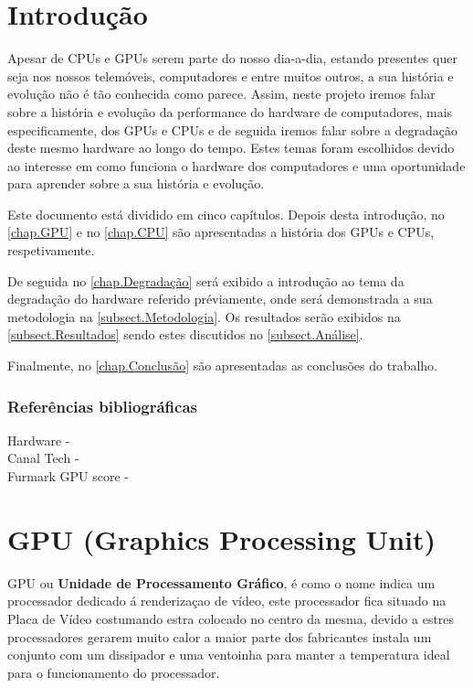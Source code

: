 \documentclass{report}
\begin{document}
\clearpage
{}

\chapter{Introdução}
\label{chap.introducao}
\begin{large}
	Apesar de \ac{CPU}s e \ac{GPU}s serem parte do nosso dia-a-dia, estando presentes quer seja nos nossos telemóveis, computadores e entre muitos outros, a sua história e evolução não é tão conhecida como parece. Assim, neste projeto iremos falar sobre a história e evolução da performance do hardware de computadores, mais especificamente, dos \ac{GPU}s e \ac{CPU}s e de seguida iremos falar sobre a degradação deste mesmo hardware ao longo do tempo. Estes temas foram escolhidos devido ao interesse em como funciona o hardware dos computadores e uma oportunidade para aprender sobre a sua história e evolução.

Este documento está dividido em cinco capítulos.
Depois desta introdução,
no \autoref{chap.GPU} e no \autoref{chap.CPU} são apresentadas a história dos \ac{GPU}s e \ac{CPU}s, respetivamente.

De seguida no \autoref{chap.Degradação} será exibido a introdução ao tema da degradação do hardware referido préviamente, onde será demonstrada a sua metodologia na \autoref{subsect.Metodologia}. Os resultados serão exibidos na \autoref{subsect.Resultados} sendo estes discutidos no \autoref{subsect.Análise}.

Finalmente, no \autoref{chap.Conclusão} são apresentadas
as conclusões do trabalho.
\end{large}


\subsection{Referências bibliográficas}
Hardware - \cite{hardware}\\
Canal Tech - \cite{canaltech}\\
Furmark \ac{GPU} score - \cite{furmark}\\

\chapter{GPU (Graphics Processing Unit)}
\label{chap.GPU}

\ac{GPU} ou \textbf{Unidade de Processamento Gráfico}, é como o nome indica um processador dedicado á renderizaçao de vídeo, este processador fica situado na Placa de Vídeo costumando estra colocado no centro da mesma, devido a estres processadores gerarem muito calor a maior parte dos fabricantes instala um conjunto com um dissipador e uma ventoinha para manter a temperatura ideal para o funcionamento do processador.
\end{document}

